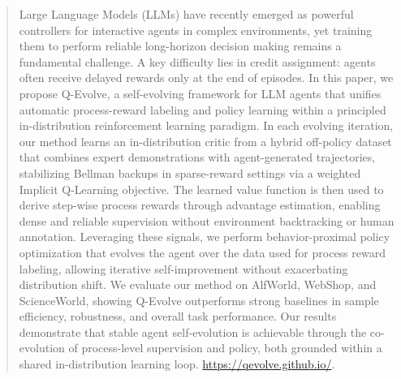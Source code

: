 \documentclass{article}
\theoremstyle{plain}
\theoremstyle{definition}
\theoremstyle{remark}
\begin{document}
\begin{abstract}
Large Language Models (LLMs) have recently emerged as powerful controllers for interactive agents in complex environments, yet training them to perform reliable long-horizon decision making remains a fundamental challenge. A key difficulty lies in credit assignment: agents often receive delayed rewards only at the end of episodes.
In this paper, we propose Q-Evolve, a self-evolving framework for LLM agents that unifies automatic process-reward labeling and policy learning within a principled in-distribution reinforcement learning paradigm. In each evolving iteration, our method learns an in-distribution critic from a hybrid off-policy dataset that combines expert demonstrations with agent-generated trajectories, stabilizing Bellman backups in sparse-reward settings via a weighted Implicit Q-Learning objective. The learned value function is then used to derive step-wise process rewards through advantage estimation, enabling dense and reliable supervision without environment backtracking or human annotation. Leveraging these signals, we perform behavior-proximal policy optimization that evolves the agent over the data used for process reward labeling, allowing iterative self-improvement without exacerbating distribution shift.
We evaluate our method on AlfWorld, WebShop, and ScienceWorld, showing Q-Evolve outperforms strong baselines in sample efficiency, robustness, and overall task performance. Our results demonstrate that stable agent self-evolution is achievable through the co-evolution of process-level supervision and policy, both grounded within a shared in-distribution learning loop. \href{https://qevolve.github.io/}{https://qevolve.github.io/}.
\end{abstract}
\end{document}
